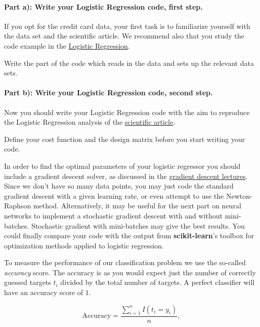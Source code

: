 \documentclass[%
oneside,                 %
final,                   %
10pt]{article}
\begin{document}
\paragraph{Part a): Write your Logistic Regression code, first step.}
If you opt for the credit card data, your first task is to familiarize yourself with the data set and the scientific article. 
We recommend also that you study the code example in the \href{{https://compphysics.github.io/MachineLearning/doc/pub/LogReg/html/LogReg.html}}{Logistic Regression}. 

Write the part of the code which reads in the data and sets up the relevant data sets. 

\paragraph{Part b): Write your Logistic Regression code, second step.}
Now you should write your Logistic Regression code with the aim to
reproduce the Logistic Regression analysis of the \href{{https://bradzzz.gitbooks.io/ga-seattle-dsi/content/dsi/dsi_05_classification_databases/2.1-lesson/assets/datasets/DefaultCreditCardClients_yeh_2009.pdf}}{scientific
article}.

Define your cost function and the design matrix before you start writing your code.

In order to find the optimal parameters of your logistic regressor you
should include a gradient descent solver, as discussed in the
\href{{https://compphysics.github.io/MachineLearning/doc/pub/Splines/html/Splines-bs.html}}{gradient descent
lectures}.
Since we don't have so many data points, you may just code the
standard gradient descent with a given learning rate, or even attempt
to use the Newton-Raphson method.  Alternatively, it may be useful for
the next part on neural networks to implement a stochastic gradient
descent with and without mini-batches. Stochastic gradient with
mini-batches may give the best results. You could finally compare your
code with the output from \textbf{scikit-learn}'s toolbox for optimization
methods applied to logistic regression.


To measure the performance of our classification problem we use the
so-called \emph{accuracy} score.  The accuracy is as you would expect just
the number of correctly guessed targets $t_i$ divided by the total
number of targets. A perfect classifier will have an accuracy score of
$1$.

\[ 
\text{Accuracy} = \frac{\sum_{i=1}^n I(t_i = y_i)}{n} ,
\]
\end{document}
